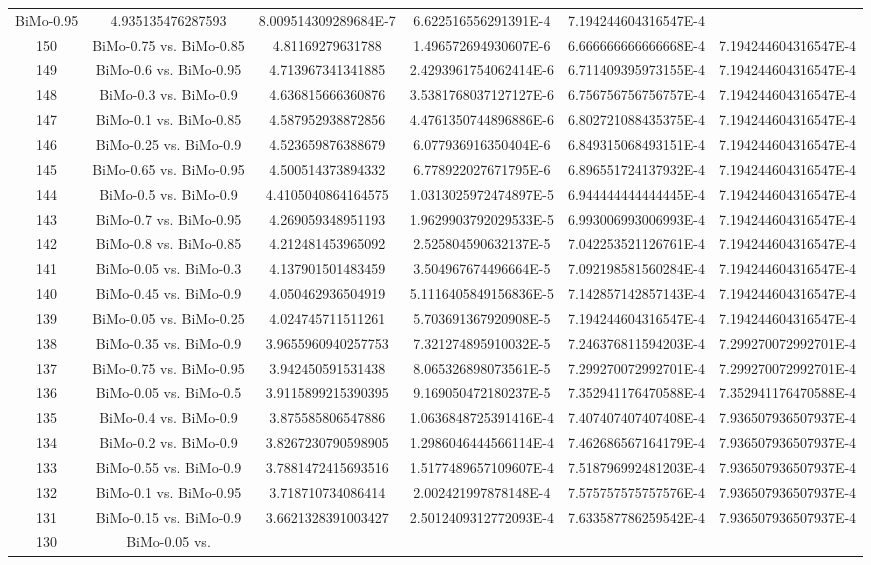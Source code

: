 \documentclass[a4paper,10pt]{article}
\begin{document}
\begin{landscape}
\begin{table}[!htp]
\begin{tabular}{cccccc}
BiMo-0.95&4.935135476287593&8.009514309289684E-7&6.622516556291391E-4&7.194244604316547E-4\\150&BiMo-0.75 vs. BiMo-0.85&4.81169279631788&1.496572694930607E-6&6.666666666666668E-4&7.194244604316547E-4\\149&BiMo-0.6 vs. BiMo-0.95&4.713967341341885&2.4293961754062414E-6&6.711409395973155E-4&7.194244604316547E-4\\148&BiMo-0.3 vs. BiMo-0.9&4.636815666360876&3.5381768037127127E-6&6.756756756756757E-4&7.194244604316547E-4\\147&BiMo-0.1 vs. BiMo-0.85&4.587952938872856&4.4761350744896886E-6&6.802721088435375E-4&7.194244604316547E-4\\146&BiMo-0.25 vs. BiMo-0.9&4.523659876388679&6.077936916350404E-6&6.849315068493151E-4&7.194244604316547E-4\\145&BiMo-0.65 vs. BiMo-0.95&4.500514373894332&6.778922027671795E-6&6.896551724137932E-4&7.194244604316547E-4\\144&BiMo-0.5 vs. BiMo-0.9&4.4105040864164575&1.0313025972474897E-5&6.944444444444445E-4&7.194244604316547E-4\\143&BiMo-0.7 vs. BiMo-0.95&4.269059348951193&1.9629903792029533E-5&6.993006993006993E-4&7.194244604316547E-4\\142&BiMo-0.8 vs. BiMo-0.85&4.212481453965092&2.525804590632137E-5&7.042253521126761E-4&7.194244604316547E-4\\141&BiMo-0.05 vs. BiMo-0.3&4.137901501483459&3.504967674496664E-5&7.092198581560284E-4&7.194244604316547E-4\\140&BiMo-0.45 vs. BiMo-0.9&4.050462936504919&5.1116405849156836E-5&7.142857142857143E-4&7.194244604316547E-4\\139&BiMo-0.05 vs. BiMo-0.25&4.024745711511261&5.703691367920908E-5&7.194244604316547E-4&7.194244604316547E-4\\138&BiMo-0.35 vs. BiMo-0.9&3.9655960940257753&7.321274895910032E-5&7.246376811594203E-4&7.299270072992701E-4\\137&BiMo-0.75 vs. BiMo-0.95&3.942450591531438&8.065326898073561E-5&7.299270072992701E-4&7.299270072992701E-4\\136&BiMo-0.05 vs. BiMo-0.5&3.9115899215390395&9.169050472180237E-5&7.352941176470588E-4&7.352941176470588E-4\\135&BiMo-0.4 vs. BiMo-0.9&3.875585806547886&1.0636848725391416E-4&7.407407407407408E-4&7.936507936507937E-4\\134&BiMo-0.2 vs. BiMo-0.9&3.8267230790598905&1.2986046444566114E-4&7.462686567164179E-4&7.936507936507937E-4\\133&BiMo-0.55 vs. BiMo-0.9&3.7881472415693516&1.5177489657109607E-4&7.518796992481203E-4&7.936507936507937E-4\\132&BiMo-0.1 vs. BiMo-0.95&3.718710734086414&2.002421997878148E-4&7.575757575757576E-4&7.936507936507937E-4\\131&BiMo-0.15 vs. BiMo-0.9&3.6621328391003427&2.5012409312772093E-4&7.633587786259542E-4&7.936507936507937E-4\\130&BiMo-0.05 vs. 
\end{tabular}
\end{table}
\end{landscape}
\end{document}
